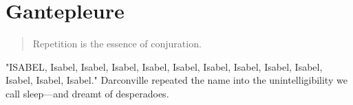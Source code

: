 \chapter{ Gantepleure}

\begin{quotation}
  Repetition is the essence of conjuration.
\end{quotation} 
\vspace{0.2cm}
 
  "ISABEL, Isabel, Isabel, Isabel, Isabel, Isabel, Isabel, Isabel, Isabel,
Isabel, Isabel, Isabel, Isabel." Darconville repeated the name into the
unintelligibility we call sleep—and dreamt of desperadoes.
 



